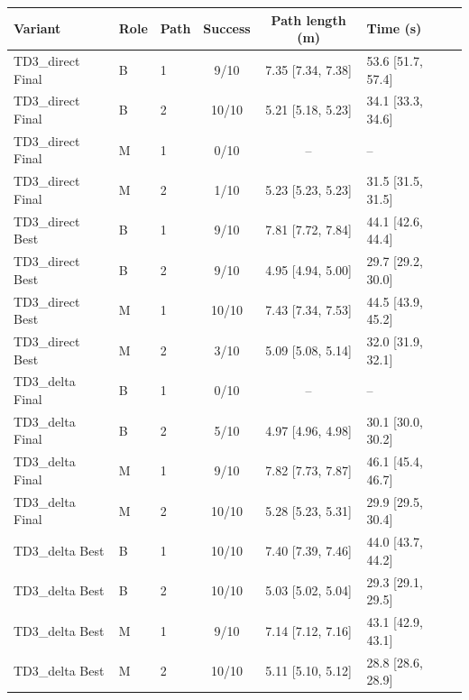 \begin{tabular}{lllccll}
\midrule[1.5pt]
\textbf{Variant} & \textbf{Role} & \textbf{Path} & \textbf{Success} & \textbf{Path length (m)} & \textbf{Time (s)} \\
\midrule[1.5pt]
TD3\_direct Final & B & 1 & 9/10 & 7.35 [7.34, 7.38] & 53.6 [51.7, 57.4] \\
TD3\_direct Final & B & 2 & 10/10 & 5.21 [5.18, 5.23] & 34.1 [33.3, 34.6] \\
TD3\_direct Final & M & 1 & 0/10 & -- & -- \\
TD3\_direct Final & M & 2 & 1/10 & 5.23 [5.23, 5.23] & 31.5 [31.5, 31.5] \\
\midrule
TD3\_direct Best & B & 1 & 9/10 & 7.81 [7.72, 7.84] & 44.1 [42.6, 44.4] \\
TD3\_direct Best & B & 2 & 9/10 & 4.95 [4.94, 5.00] & 29.7 [29.2, 30.0] \\
TD3\_direct Best & M & 1 & 10/10 & 7.43 [7.34, 7.53] & 44.5 [43.9, 45.2] \\
TD3\_direct Best & M & 2 & 3/10 & 5.09 [5.08, 5.14] & 32.0 [31.9, 32.1] \\
\midrule
TD3\_delta Final & B & 1 & 0/10 & -- & -- \\
TD3\_delta Final & B & 2 & 5/10 & 4.97 [4.96, 4.98] & 30.1 [30.0, 30.2] \\
TD3\_delta Final & M & 1 & 9/10 & 7.82 [7.73, 7.87] & 46.1 [45.4, 46.7] \\
TD3\_delta Final & M & 2 & 10/10 & 5.28 [5.23, 5.31] & 29.9 [29.5, 30.4] \\
\midrule
TD3\_delta Best & B & 1 & 10/10 & 7.40 [7.39, 7.46] & 44.0 [43.7, 44.2] \\
TD3\_delta Best & B & 2 & 10/10 & 5.03 [5.02, 5.04] & 29.3 [29.1, 29.5] \\
TD3\_delta Best & M & 1 & 9/10 & 7.14 [7.12, 7.16] & 43.1 [42.9, 43.1] \\
TD3\_delta Best & M & 2 & 10/10 & 5.11 [5.10, 5.12] & 28.8 [28.6, 28.9] \\
\midrule[1.5pt]
\end{tabular}
